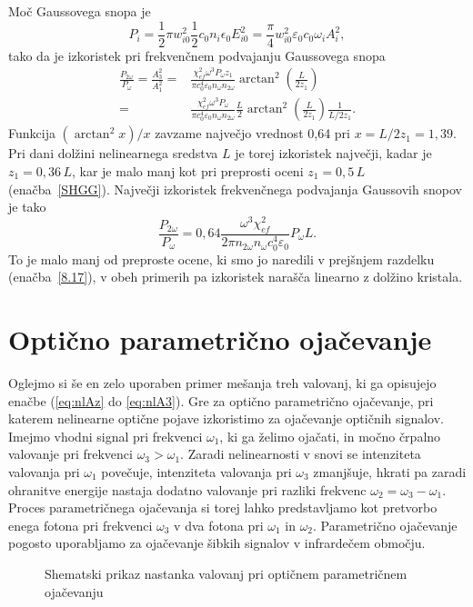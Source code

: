 Moč Gaussovega snopa je
\begin{equation}
P_{i}=\frac{1}{2}\pi w_{i0}^{2} \frac{1}{2}c_0 n_i \epsilon_{0}E_{i0}^{2}=
\frac{\pi}{4}w_{i0}^{2}\varepsilon_0 c_0 \omega_{i} A_{i}^{2},
\label{8.26}
\end{equation}
tako da je izkoristek pri frekvenčnem podvajanju Gaussovega snopa 
\begin{equation}
\begin{aligned}
\frac{P_{2\omega}}{P_{\omega}}=\frac{A_3^2}{A_1^2}  = &
\frac{\chi_{ef}^2 \omega^3 P_\omega z_1}{\pi c_0^4 \varepsilon_0 n_\omega n_{2\omega}} 
\arctan^2 \left( \frac{L}{2z_1}\right) \\
 = &\frac{\chi_{ef}^2 \omega^3 P_\omega}{\pi c_0^4 \varepsilon_0 n_\omega n_{2\omega}} \frac{L}{2}
\arctan^2 \left( \frac{L}{2z_1}\right) \frac{1}{L/2z_1}.
\label{8.27}
\end{aligned}
\end{equation}
Funkcija $(\arctan^{2}x)/x$ zavzame največjo vrednost 0,64 pri $x =L/2z_1=1,39$.
Pri dani dolžini nelinearnega sredstva $L$ je torej 
izkoristek največji, kadar je $z_{1}=0,36\,L$, kar je malo manj kot pri
preprosti oceni $z_{1}=0,5\,L$ (enačba~\ref{SHGG}). Največji izkoristek
frekvenčnega podvajanja Gaussovih snopov je tako
\begin{equation}
\frac{P_{2\omega}}{P_{\omega}}
= 0,64 \frac{\omega^3 \chi_{ef}^2}{2\pi n_{2\omega} n_{\omega} c_0^4 \varepsilon_0 } P_\omega L.
\label{8.28}
\end{equation}
To je malo manj od preproste ocene, ki smo jo naredili v prejšnjem razdelku (enačba~\ref{8.17}),
v obeh primerih pa izkoristek narašča linearno z dolžino kristala.

\section{Optično parametrično ojačevanje}

Oglejmo si še en zelo uporaben primer mešanja treh valovanj, 
ki ga opisujejo enačbe (\ref{eq:nlAz} do \ref{eq:nlA3}). Gre za
optično parametrično ojačevanje, pri katerem nelinearne optične pojave
izkoristimo za ojačevanje optičnih signalov. Imejmo vhodni
signal pri frekvenci $\omega_{1}$, ki ga želimo ojačati, in močno črpalno valovanje
pri frekvenci $\omega_{3}>\omega_{1}$. Zaradi nelinearnosti v snovi se 
intenziteta valovanja pri $\omega_{1}$ povečuje, 
intenziteta valovanja pri $\omega_{3}$ zmanjšuje, hkrati pa zaradi
ohranitve energije nastaja dodatno valovanje pri razliki frekvenc
$\omega_{2}=\omega_{3}-\omega_{1}$. Proces parametričnega ojačevanja 
si torej lahko predstavljamo kot pretvorbo enega fotona pri frekvenci 
$\omega_{3}$ v dva fotona pri $\omega_{1}$ in $\omega_{2}$.
Parametrično ojačevanje pogosto uporabljamo za ojačevanje šibkih signalov 
v infrardečem območju.
\begin{figure}[h]
\centering
\def\svgwidth{80truemm} 

\caption{Shematski prikaz nastanka valovanj pri optičnem parametričnem ojačevanju}
\label{fig:opa2}
\end{figure}

